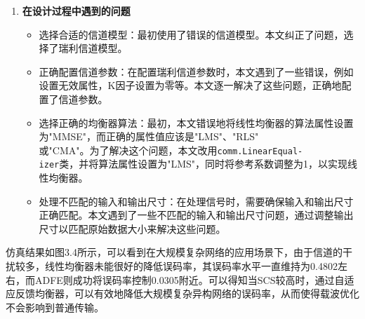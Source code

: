 \documentclass[UTF8,a4paper,12pt]{ctexart}
\numberwithin{equation}{section}
\begin{document}
\begin{enumerate}
	\item \textbf{在设计过程中遇到的问题}
	\begin{itemize}
		\item 选择合适的信道模型：最初使用了错误的信道模型。本文纠正了问题，选择了瑞利信道模型。
		\item 正确配置信道参数：在配置瑞利信道参数时，本文遇到了一些错误，例如设置无效属性，K因子设置为零等。本文逐一解决了这些问题，正确地配置了信道参数。
		\item 选择正确的均衡器算法：最初，本文错误地将线性均衡器的算法属性设置为"MMSE"，而正确的属性值应该是"LMS"、"RLS"\\或"CMA"。为了解决这个问题，本文改用\texttt{comm.LinearEqual-\\izer}类，并将算法属性设置为"LMS"，同时将参考系数调整为1，以实现线性均衡器。
		\item 处理不匹配的输入和输出尺寸：在处理信号时，需要确保输入和输出尺寸正确匹配。本文遇到了一些不匹配的输入和输出尺寸问题，通过调整输出尺寸以匹配原始数据大小来解决这些问题。
	\end{itemize}
\end{enumerate}

仿真结果如图3.4所示，可以看到在大规模复杂网络的应用场景下，由于信道的干扰较多，线性均衡器未能很好的降低误码率，其误码率水平一直维持为0.4802左右，而ADFE则成功将误码率控制0.0305附近。可以得知当SCS较高时，通过自适应反馈均衡器，可以有效地降低大规模复杂异构网络的误码率，从而使得载波优化不会影响到普通传输。
\begin{figure}[H] 
\end{figure}
\end{document}

